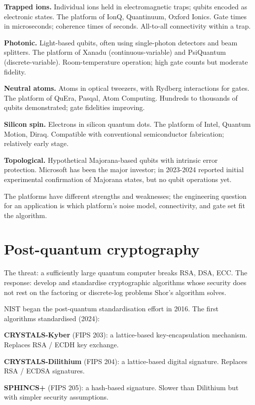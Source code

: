 \textbf{Trapped ions.} Individual ions held in electromagnetic traps; qubits encoded as electronic states. The platform of IonQ, Quantinuum, Oxford Ionics. Gate times in microseconds; coherence times of seconds. All-to-all connectivity within a trap.

\textbf{Photonic.} Light-based qubits, often using single-photon detectors and beam splitters. The platform of Xanadu (continuous-variable) and PsiQuantum (discrete-variable). Room-temperature operation; high gate counts but moderate fidelity.

\textbf{Neutral atoms.} Atoms in optical tweezers, with Rydberg interactions for gates. The platform of QuEra, Pasqal, Atom Computing. Hundreds to thousands of qubits demonstrated; gate fidelities improving.

\textbf{Silicon spin.} Electrons in silicon quantum dots. The platform of Intel, Quantum Motion, Diraq. Compatible with conventional semiconductor fabrication; relatively early stage.

\textbf{Topological.} Hypothetical Majorana-based qubits with intrinsic error protection. Microsoft has been the major investor; in 2023-2024 reported initial experimental confirmation of Majorana states, but no qubit operations yet.

The platforms have different strengths and weaknesses; the engineering question for an application is which platform's noise model, connectivity, and gate set fit the algorithm.

\section{Post-quantum cryptography}

The threat: a sufficiently large quantum computer breaks RSA, DSA, ECC. The response: develop and standardise cryptographic algorithms whose security does not rest on the factoring or discrete-log problems Shor's algorithm solves.

NIST began the post-quantum standardisation effort in 2016. The first algorithms standardised (2024):

\textbf{CRYSTALS-Kyber} (FIPS 203): a lattice-based key-encapsulation mechanism. Replaces RSA / ECDH key exchange.

\textbf{CRYSTALS-Dilithium} (FIPS 204): a lattice-based digital signature. Replaces RSA / ECDSA signatures.

\textbf{SPHINCS+} (FIPS 205): a hash-based signature. Slower than Dilithium but with simpler security assumptions.

